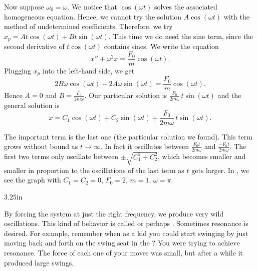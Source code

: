 Now suppose $\omega_0 = \omega$.
We notice that $\cos (\omega t)$ solves the associated
homogeneous equation.
Hence, we cannot try
the solution $A \cos (\omega t)$ with the method of undetermined
coefficients.
Therefore, we 
try $x_p = A t \cos (\omega t) + B t \sin (\omega t)$.
This time we do need the sine
term, since the second derivative of $t \cos (\omega t)$ contains sines.
We write the equation
\begin{equation*}
x'' + \omega^2 x = \frac{F_0}{m} \cos ( \omega t) .
\end{equation*}
Plugging $x_p$ into the left-hand side, we get
\begin{equation*}
2 B \omega \cos (\omega t) - 2 A \omega \sin (\omega t) = 
\frac{F_0}{m} \cos (\omega t) .
\end{equation*}
Hence $A = 0$ and $B = \frac{F_0}{2m\omega}$.  Our particular solution is
$\frac{F_0}{2m\omega} \, t \sin (\omega t)$ and the general solution is
\begin{equation*}
x = C_1 \cos (\omega t) + C_2 \sin (\omega t)
+ \frac{F_0}{2m\omega} \, t \sin (\omega t) .
\end{equation*}

The important term is the last one (the particular solution we found).  
This term grows without bound as $t \to \infty$.  In fact it
oscillates 
between $\frac{F_0 t}{2m\omega}$ and
$\frac{- F_0 t}{2m\omega}$.  The first two terms only oscillate between
$\pm\sqrt{C_1^2 + C_2^2}$, which becomes smaller and smaller in proportion to
the oscillations of the last term as $t$ gets larger.  In
, we see the graph with $C_1=C_2=0$, $F_0 = 2$,
$m=1$, $\omega = \pi$.

\begin{mywrapfig}{3.25in}
\capstart
{}
\caption{Graph of
$\frac{1}{\pi} t \sin (\pi t)$.\label{3.6:resonancefig}}
\end{mywrapfig}

By forcing the system at just the right frequency, we produce very wild
oscillations.  This kind of behavior is called \emph{} or
perhaps
\emph{}.  Sometimes resonance is
desired.  For
example, remember when as a kid you could start swinging by just moving back
and forth on the swing seat in the ?  You were trying to
achieve resonance.  The force of each one of your moves was small, but after a
while it produced large swings.

